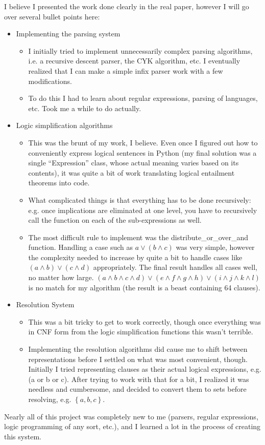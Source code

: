 \documentclass[english]{article}
\begin{document}
I believe I presented the work done clearly in the real paper, however
I will go over several bullet points here:
\begin{itemize}
\item Implementing the parsing system

\begin{itemize}
\item I initially tried to implement unnecessarily complex parsing algorithms,
i.e. a recursive descent parser, the CYK algorithm, etc. I eventually
realized that I can make a simple infix parser work with a few modifications.
\item To do this I had to learn about regular expressions, parsing of languages,
etc. Took me a while to do actually.
\end{itemize}
\item Logic simplification algorithms

\begin{itemize}
\item This was the brunt of my work, I believe. Even once I figured out
how to conveniently express logical sentences in Python (my final
solution was a single {}``Expression'' class, whose actual meaning
varies based on its contents), it was quite a bit of work translating
logical entailment theorems into code. 
\item What complicated things is that everything has to be done recursively:
e.g. once implications are eliminated at one level, you have to recursively
call the function on each of the sub-expressions as well. 
\item The most difficult rule to implement was the distribute\_or\_over\_and
function. Handling a case such as $a\lor\left(b\land c\right)$ was
very simple, however the complexity needed to increase by quite a
bit to handle cases like $\left(a\land b\right)\lor\left(c\land d\right)$
appropriately. The final result handles all cases well, no matter
how large. $\left(a\land b\land c\land d\right)\lor\left(e\land f\land g\land h\right)\lor\left(i\land j\land k\land l\right)$
is no match for my algorithm (the result is a beast containing 64
clauses).
\end{itemize}
\item Resolution System

\begin{itemize}
\item This was a bit tricky to get to work correctly, though once everything
was in CNF form from the logic simplification functions this wasn't
terrible.
\item Implementing the resolution algorithms did cause me to shift between
representations before I settled on what was most convenient, though.
Initially I tried representing clauses as their actual logical expressions,
e.g. (a or b or c). After trying to work with that for a bit, I realized
it was needless and cumbersome, and decided to convert them to sets
before resolving, e.g. $\left\{ a,b,c\right\} $. 
\end{itemize}
\end{itemize}
Nearly all of this project was completely new to me (parsers, regular
expressions, logic programming of any sort, etc.), and I learned a
lot in the process of creating this system. 
\end{document}
